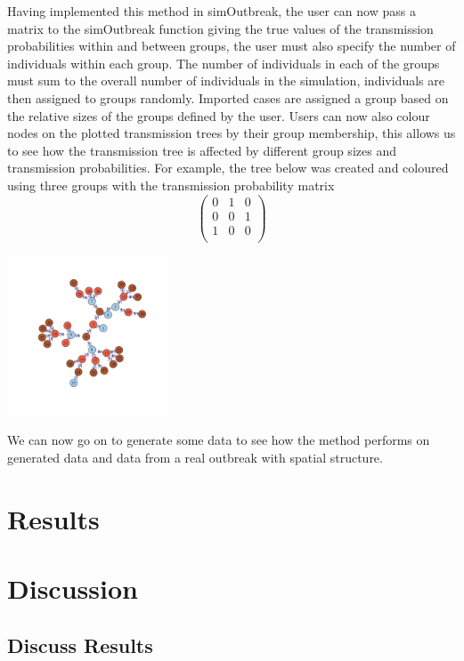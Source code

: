 \documentclass[11pt,a4paper]{report}
\begin{document}
Having implemented this method in simOutbreak, the user can now pass a matrix to the simOutbreak function giving the true values of the transmission probabilities within and between groups, the user must also specify the number of individuals within each group. The number of individuals in each of the groups must sum to the overall number of individuals in the simulation, individuals are then assigned to groups randomly. Imported cases are assigned a group based on the relative sizes of the groups defined by the user. Users can now also colour nodes on the plotted transmission trees by their group membership, this allows us to see how the transmission tree is affected by different group sizes and transmission probabilities. For example, the tree below was created and coloured using three groups with the transmission probability matrix
\[ \left( \begin{array}{ccc}
0 & 1 & 0 \\
0 & 0 & 1 \\
1 & 0 & 0 \\
\end{array} \right) \]
\begin{center}
\includegraphics[width=180px]{treexample.png}
\end{center}
We can now go on to generate some data to see how the method performs on generated data and data from a real outbreak with spatial structure.

\chapter{Results}
\chapter{Discussion}
\section{Discuss Results}
\end{document}
